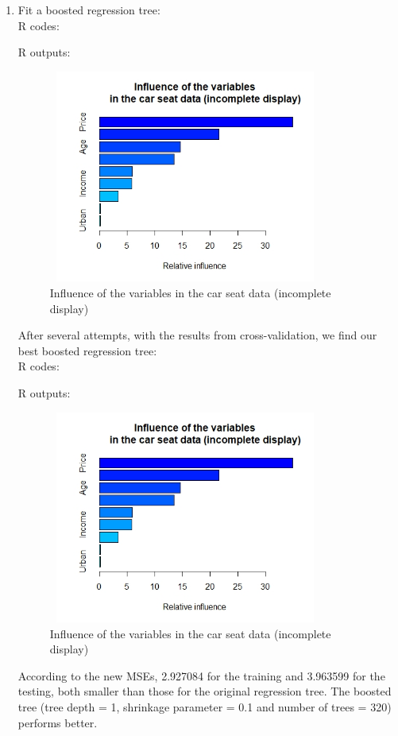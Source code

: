 \documentclass[10pt]{article}
\begin{document}
\begin{enumerate}[1)]
\item
Fit a boosted regression tree:\\
R codes:

R outputs:

\begin{figure}[H]
  \centering
  \includegraphics[width=9cm,height=7cm]{p14a.jpeg}
  \caption{Influence of the variables in the car seat data (incomplete display)}
\end{figure}
After several attempts, with the results from cross-validation, we find our best boosted regression tree:\\
R codes:

R outputs:
\begin{figure}[H]
  \centering
  \includegraphics[width=9cm,height=7cm]{p14a.jpeg}
  \caption{Influence of the variables in the car seat data (incomplete display)}
\end{figure}
According to the new MSEs, 2.927084 for the training and 3.963599 for the testing, both smaller than those for the original regression tree. The boosted tree (tree depth = 1, shrinkage parameter = 0.1 and number of trees = 320) performs better.
\vspace{3mm}


\end{enumerate}
\end{document}
